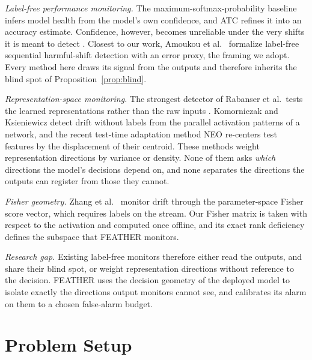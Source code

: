 \documentclass[conference]{IEEEtran}
\begin{document}
\textit{Label-free performance monitoring.}
The maximum-softmax-probability baseline \cite{hendrycks2017baseline} infers
model health from the model's own confidence, and ATC \cite{garg2022atc}
refines it into an accuracy estimate. Confidence, however, becomes unreliable
under the very shifts it is meant to detect \cite{ovadia2019trust}. Closest to
our work, Amoukou et al.\ \cite{amoukou2024sequential} formalize label-free
sequential harmful-shift detection with an error proxy, the framing we adopt.
Every method here draws its signal from the outputs and therefore inherits the
blind spot of Proposition~\ref{prop:blind}.

\textit{Representation-space monitoring.}
The strongest detector of Rabanser et al.\ tests the learned representations
rather than the raw inputs \cite{rabanser2019failing}. Komorniczak and
Ksieniewicz \cite{komorniczak2024parallel} detect drift without labels from
the parallel activation patterns of a network, and the recent test-time
adaptation method NEO \cite{murphy2026neo} re-centers test features by the
displacement of their centroid. These methods weight representation
directions by variance or density. None of them asks \emph{which} directions
the model's decisions depend on, and none separates the directions the
outputs can register from those they cannot.

\textit{Fisher geometry.}
Zhang et al.\ \cite{zhang2023score} monitor drift through the parameter-space
Fisher score vector, which requires labels on the stream. Our Fisher matrix is
taken with respect to the activation and computed once offline, and its exact
rank deficiency defines the subspace that FEATHER monitors.

\textit{Research gap.}
Existing label-free monitors therefore either read the outputs, and share
their blind spot, or weight representation directions without reference to
the decision. FEATHER uses the decision geometry of the deployed model to
isolate exactly the directions output monitors cannot see, and calibrates its
alarm on them to a chosen false-alarm budget.

\section{Problem Setup}
\label{sec:setup}
\end{document}
